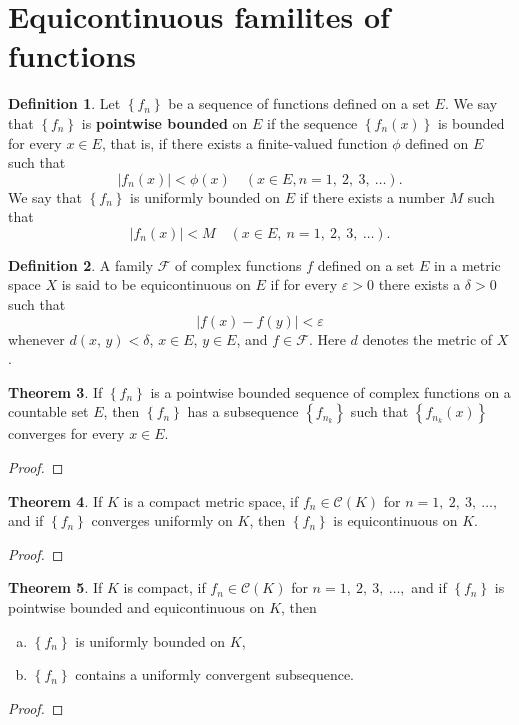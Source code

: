 \documentclass[12pt]{book}
\theoremstyle{definition}
\newtheorem{theorem}{Theorem}[chapter]
\newtheorem{definition}[theorem]{Definition}
\begin{document}
	\section*{Equicontinuous familites of functions}
	\begin{definition}
		Let $\left\{f_n\right\}$ be a sequence of functions defined on a set $E$. We say that $\left\{f_n\right\}$ is \textbf{pointwise bounded} on $E$ if the sequence $\left\{f_n(x)\right\}$ is bounded for every $x\in E$, that is, if there exists a finite-valued function $\phi$ defined on $E$ such that $$|f_n(x)|<\phi(x)\quad (x\in E, n=1,~2,~3,~\ldots).$$ We say that $\left\{f_n\right\}$ is uniformly bounded on $E$ if there exists a number $M$ such that $$|f_n(x)|<M\quad (x\in E,~n=1,~2,~3,~\ldots).$$
	\end{definition}
	\newpage
	\begin{definition}
		A family $\mathscr{F}$ of complex functions $f$ defined on a set $E$ in a metric space $X$ is said to be equicontinuous on $E$ if for every $\varepsilon>0$ there exists a $\delta>0$ such that $$|f(x)-f(y)|<\varepsilon$$ whenever $d(x,\,y)<\delta$, $x\in E$, $y\in E$, and $f\in\mathscr{F}$. Here $d$ denotes the metric of $X$.
	\end{definition}
	\newpage
	\begin{theorem}
		If $\left\{f_n\right\}$ is a pointwise bounded sequence of complex functions on a countable set $E$, then $\left\{f_n\right\}$ has a subsequence $\left\{f_{n_k}\right\}$ such that $\left\{f_{n_k}(x)\right\}$ converges for every $x\in E$.
	\end{theorem}
	\begin{proof}
	\end{proof}
	\newpage
	\begin{theorem}
		If $K$ is a compact metric space, if $f_n\in\mathscr{C}(K)$ for $n=1,~2,~3,~\ldots,$ and if $\left\{f_n\right\}$ converges uniformly on $K$, then $\left\{f_n\right\}$ is equicontinuous on $K$.
	\end{theorem}
	\begin{proof}
	\end{proof}
	\newpage
	\begin{theorem}
		If $K$ is compact, if $f_n\in\mathscr{C}(K)$ for $n=1,~2,~3,~\ldots,$ and if $\left\{f_n\right\}$ is pointwise bounded and equicontinuous on $K$, then \begin{enumerate}[(a)]
			\item $\left\{f_n\right\}$ is uniformly bounded on $K$,
			\item $\left\{f_n\right\}$ contains a uniformly convergent subsequence.
		\end{enumerate}
	\end{theorem}
	\begin{proof}
	\end{proof}
	\newpage
\end{document}
